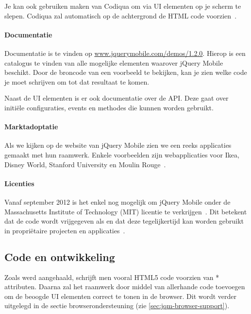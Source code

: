 Je kan ook gebruiken maken van Codiqua om via  UI elementen op je scherm te slepen. Codiqua zal automatisch op de achtergrond de HTML code voorzien~\cite{Sperry2012}.

\paragraph{Documentatie}
Documentatie is te vinden op \url{www.jquerymobile.com/demos/1.2.0}. Hierop is een catalogus te vinden van alle mogelijke elementen waarover jQuery Mobile beschikt. Door de broncode van een voorbeeld te bekijken, kan je zien welke code je moet schrijven om tot dat resultaat te komen.

Naast de UI elementen is er ook documentatie over de API. Deze gaat over initiële configuraties, events en methodes die kunnen worden gebruikt.


\paragraph{Marktadoptatie}
Als we kijken op de website van jQuery Mobile zien we een reeks applicaties gemaakt met hun raamwerk. Enkele voorbeelden zijn webapplicaties voor Ikea, Disney World, Stanford University en Moulin Rouge~\cite{JQuery2012a}. 

\paragraph{Licenties}
Vanaf september 2012 is het enkel nog mogelijk om jQuery Mobile onder de Massachusetts Institute of Technology (MIT) licentie te verkrijgen~\cite{Dmethvin2012}. Dit betekent dat de code wordt vrijgegeven als  en dat deze tegelijkertijd kan worden gebruikt in propriëtaire projecten en applicaties~\cite{PhilDutson2012}.

\subsection{Code en ontwikkeling}
Zoals werd aangehaald, schrijft men vooral HTML5 code voorzien van * attributen. Daarna zal het raamwerk door middel van  allerhande code toevoegen om de beoogde UI elementen correct te tonen in de browser. Dit wordt verder uitgelegd in de sectie browserondersteuning (zie \ref{sec:jqm-browser-support}).


